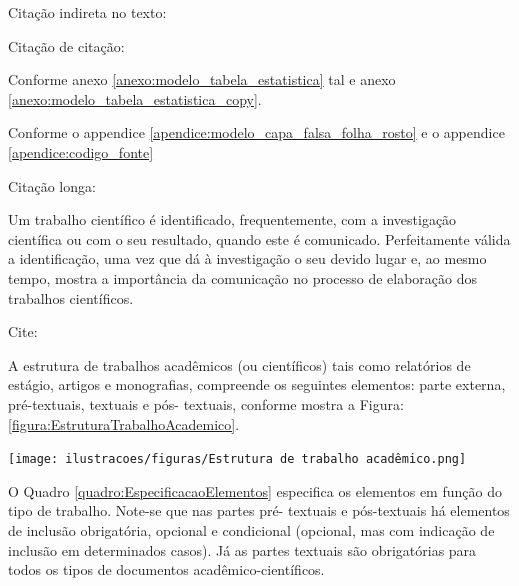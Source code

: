 \begin{Desenvolvimento}
Citação indireta no texto: 

Citação de citação: 

Conforme anexo \ref{anexo:modelo_tabela_estatistica} tal e anexo \ref{anexo:modelo_tabela_estatistica_copy}.

Conforme o appendice \ref{apendice:modelo_capa_falsa_folha_rosto} e o appendice \ref{apendice:codigo_fonte}

Citação longa: \begin{citacaodiretalonga}
Um trabalho científico é identificado, frequentemente, com a investigação científica ou com o seu resultado, quando este é comunicado. Perfeitamente válida a identificação, uma vez que dá à investigação o seu devido lugar e, ao mesmo tempo, mostra a importância da comunicação no processo de elaboração dos trabalhos científicos. 
\end{citacaodiretalonga}

Cite: \cite{santos2001}

\parencite{antonioetal2001}

\parencite{3authors}

\parencite{lorena2013cluster}

\parencite{paim1998questoes}

\parencite{santos2004dicionario}

A estrutura de trabalhos acadêmicos (ou científicos) tais como relatórios de estágio, artigos e monografias, compreende os seguintes elementos: parte externa, pré-textuais, textuais e pós- textuais, conforme mostra a Figura: \ref{figura:EstruturaTrabalhoAcademico}.

\begin{figura}[h!]
  \centering
  \addfigura
  \texttt{[image: ilustracoes/figuras/Estrutura de trabalho acadêmico.png]}
  \label{figura:EstruturaTrabalhoAcademico}
\end{figura}

O Quadro \ref{quadro:EspecificacaoElementos} especifica os elementos em função do tipo de trabalho. Note-se que nas partes pré- textuais e pós-textuais há elementos de inclusão obrigatória, opcional e condicional (opcional, mas com indicação de inclusão em determinados casos). Já as partes textuais são obrigatórias para todos os tipos de documentos acadêmico-científicos.


\end{Desenvolvimento}
